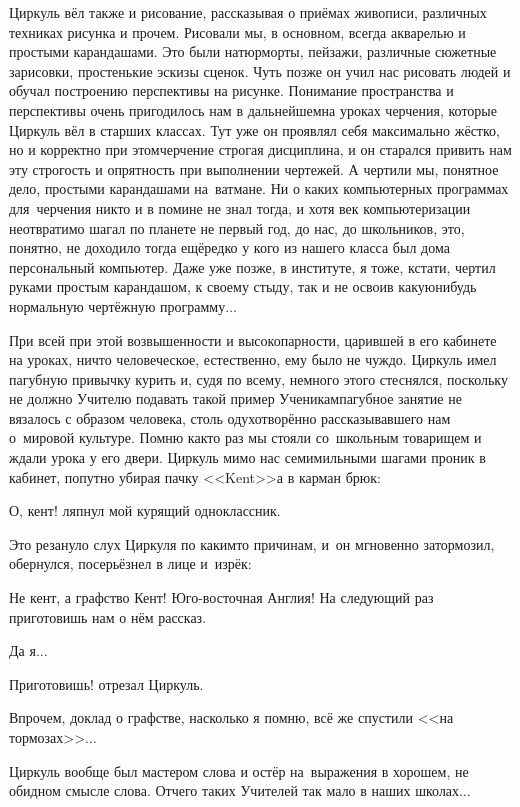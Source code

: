 Циркуль вёл также и рисование, рассказывая о приёмах живописи, различных техниках рисунка и прочем. Рисовали мы, в основном, всегда акварелью и простыми карандашами. Это были натюрморты, пейзажи, различные сюжетные зарисовки, простенькие эскизы сценок. Чуть позже он учил нас рисовать людей и обучал построению перспективы на рисунке. Понимание пространства и перспективы очень пригодилось нам в дальнейшем\mdash на уроках черчения, которые Циркуль вёл в старших классах. Тут уже он проявлял себя максимально жёстко, но и корректно при этом\mdash черчение строгая дисциплина, и он старался привить нам эту строгость и опрятность при выполнении чертежей. А чертили мы, понятное дело, простыми карандашами на~ватмане. Ни о каких компьютерных программах для~черчения никто и в помине не знал тогда, и хотя век компьютеризации неотвратимо шагал по планете не первый год, до нас, до школьников, это, понятно, не доходило тогда ещё\mdash редко у кого из нашего класса был дома персональный компьютер. Даже уже позже, в институте, я тоже, кстати, чертил руками простым карандашом, к своему стыду, так и не освоив какую\sdash нибудь нормальную чертёжную программу$\ldots$

При всей при этой возвышенности и высокопарности, царившей в его кабинете на уроках, ничто человеческое, естественно, ему было не чуждо. Циркуль имел пагубную привычку курить и, судя по всему, немного этого стеснялся, поскольку не должно Учителю подавать такой пример Ученикам\mdash пагубное занятие не вязалось с образом человека, столь одухотворённо рассказывавшего нам о~мировой культуре. Помню как\sdash то раз мы стояли со~школьным товарищем и ждали урока у его двери. Циркуль мимо нас семимильными шагами проник в кабинет, попутно убирая пачку <<Kent>>\sdash а в карман брюк:

\diagdash О, кент! \mdash ляпнул мой курящий одноклассник.

Это резануло слух Циркуля по каким\sdash то причинам, и~он мгновенно затормозил, обернулся, посерьёзнел в лице и~изрёк:

\diagdash Не кент, а графство Кент! Юго-восточная Англия! На следующий раз приготовишь нам о нём рассказ. 

\diagdash Да я$\ldots$

\diagdash Приготовишь! \mdash отрезал Циркуль.

Впрочем, доклад о графстве, насколько я помню, всё же спустили <<на тормозах>>$\ldots$

Циркуль вообще был мастером слова и остёр на~выражения в хорошем, не обидном смысле слова. Отчего таких Учителей так мало в наших школах$\ldots$ 

